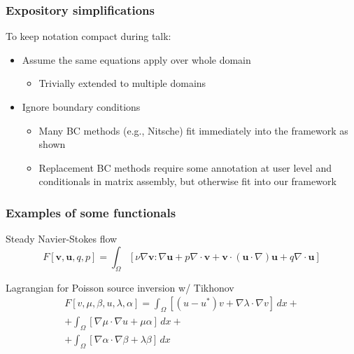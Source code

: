 \documentclass[10pt,xcolor=dvipsnames]{beamer}
\begin{document}
\frame
{
  \frametitle{Expository simplifications}

  \begin{block}{To keep notation compact during talk:}
  \begin{itemize}
  \item Assume the same equations apply over whole domain
  \begin{itemize}
  \item Trivially extended to multiple domains
  \end{itemize}
  \item Ignore boundary conditions
  \begin{itemize}
  \item Many BC methods (e.g., Nitsche) fit immediately into the framework
as shown
  \item Replacement BC methods require some annotation at user
level and conditionals in matrix assembly, but otherwise fit into our
framework
  \end{itemize}
  \end{itemize}
  \end{block}
}

\frame
{
  \frametitle{Examples of some functionals}

  \begin{block}{Steady Navier-Stokes flow}
\[
  F\left[\mathbf{v},\mathbf{u},q,p\right] = \int_\Omega
\left[\nu \nabla\mathbf{v} :\nabla\mathbf{u} + p \nabla \cdot\mathbf{v}
+ \mathbf{v}\cdot\left(\mathbf{u}\cdot\nabla\right)\mathbf{u}
+ q \nabla\cdot\mathbf{u}\right]
\]
  \end{block}

  \begin{block}{Lagrangian for Poisson source inversion w/ Tikhonov}
\begin{multline*}
  F\left[v,\mu,\beta,u,\lambda,\alpha\right]
= \int_\Omega \left[\left(u-u^*\right) v +  \nabla\lambda\cdot\nabla v \right]\, dx
+ \\
+ \int_\Omega \left[\nabla\mu\cdot\nabla u + \mu\alpha\right] \, dx + \\
+ \int_\Omega \left[\nabla \alpha \cdot \nabla\beta + \lambda \beta\right]\, dx
\end{multline*}
  \end{block}
}
\end{document}
